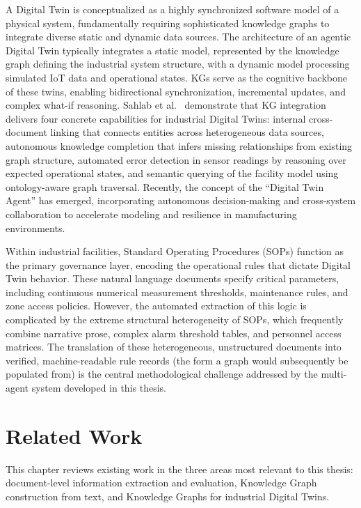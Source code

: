\documentclass[11pt]{article}
\begin{document}
A Digital Twin is conceptualized as a highly synchronized software model of a physical system, fundamentally requiring sophisticated knowledge graphs to integrate diverse static and dynamic data sources. The architecture of an agentic Digital Twin typically integrates a static model, represented by the knowledge graph defining the industrial system structure, with a dynamic model processing simulated IoT data and operational states. KGs serve as the cognitive backbone of these twins, enabling bidirectional synchronization, incremental updates, and complex what-if reasoning. Sahlab et al.~\cite{sahlab2021kg} demonstrate that KG integration delivers four concrete capabilities for industrial Digital Twins: internal cross-document linking that connects entities across heterogeneous data sources, autonomous knowledge completion that infers missing relationships from existing graph structure, automated error detection in sensor readings by reasoning over expected operational states, and semantic querying of the facility model using ontology-aware graph traversal. Recently, the concept of the ``Digital Twin Agent'' has emerged, incorporating autonomous decision-making and cross-system collaboration to accelerate modeling and resilience in manufacturing environments.

Within industrial facilities, Standard Operating Procedures (SOPs) function as the primary governance layer, encoding the operational rules that dictate Digital Twin behavior. These natural language documents specify critical parameters, including continuous numerical measurement thresholds, maintenance rules, and zone access policies. However, the automated extraction of this logic is complicated by the extreme structural heterogeneity of SOPs, which frequently combine narrative prose, complex alarm threshold tables, and personnel access matrices. The translation of these heterogeneous, unstructured documents into verified, machine-readable rule records (the form a graph would subsequently be populated from) is the central methodological challenge addressed by the multi-agent system developed in this thesis.


\section{Related Work}
\label{sec:related_work}

This chapter reviews existing work in the three areas most relevant to this
thesis: document-level information extraction and evaluation, Knowledge Graph
construction from text, and Knowledge Graphs for industrial Digital Twins.
\end{document}
